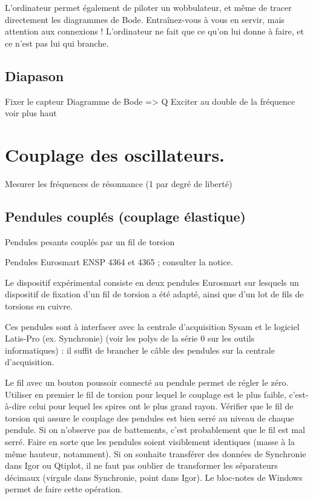 \documentclass{article}%
\begin{document}
L'ordinateur permet également de piloter un wobbulateur, et même de tracer directement les diagrammes de Bode. Entraînez-vous à vous en servir, mais attention aux connexions ! L'ordinateur ne fait que ce qu'on lui donne à faire, et ce n'est pas lui qui branche. 

\subsection{Diapason}
Fixer le capteur
Diagramme de Bode => Q
Exciter au double de la fréquence
voir plus haut
\section{Couplage des oscillateurs.}
Mesurer les fréquences de résonnance (1 par degré de liberté)
\subsection{Pendules couplés (couplage élastique)}

Pendules pesants couplés par un fil de torsion

Pendules Eurosmart ENSP 4364 et 4365 ; consulter la notice.

    Le dispositif expérimental consiste en deux pendules Eurosmart sur lesquels un dispositif de fixation d'un fil de torsion a été adapté, ainsi que d'un lot de fils de torsions en cuivre.

Ces pendules sont à interfacer avec la centrale d’acquisition Sysam et le logiciel Latis-Pro (ex. Synchronie) (voir les polys de la série 0 sur les outils informatiques) : il suffit de brancher le câble des pendules sur la centrale d'acquisition.

    Le fil avec un bouton poussoir connecté au pendule permet de régler le zéro.
    Utiliser en premier le fil de torsion pour lequel le couplage est le plus faible, c'est-à-dire celui pour lequel les spires ont le plus grand rayon.
    Vérifier que le fil de torsion qui assure le couplage des pendules est bien serré au niveau de chaque pendule. Si on n'observe pas de battements, c'est probablement que le fil est mal serré.
    Faire en sorte que les pendules soient visiblement identiques (masse à la même hauteur, notamment).
    Si on souhaite transférer des données de Synchronie dans Igor ou Qtiplot, il ne faut pas oublier de transformer les séparateurs décimaux (virgule dans Synchronie, point dans Igor). Le bloc-notes de Windows permet de faire cette opération.
\end{document}
